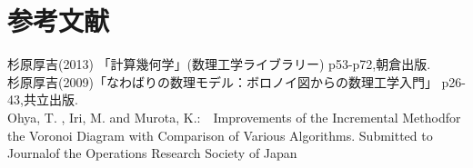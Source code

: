 \documentclass[10pt,a4paper,titlepage]{jsarticle}
\begin{document}


\section*{参考文献}
杉原厚吉(2013) 「計算幾何学」(数理工学ライブラリー) p53-p72,朝倉出版.\\
\quad 杉原厚吉(2009)「なわばりの数理モデル：ボロノイ図からの数理工学入門」 p26-43,共立出版.\\
\quad Ohya, T. , Iri, M. and Murota, K.:　Improvements of the Incremental Methodfor the Voronoi Diagram with Comparison of Various Algorithms. Submitted to Journalof the Operations Research Society of Japan\\
\end{document}
